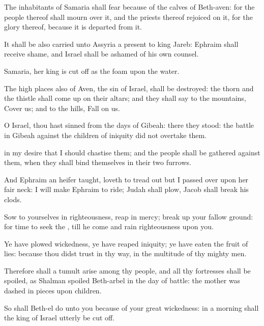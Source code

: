 {The
inhabitants of
Samaria shall
fear because of the
calves of
Beth-aven: for the
people thereof shall
mourn over it, and the
priests thereof
{}
rejoiced on it, for the
glory thereof, because it is
departed from it.

It shall be also
carried unto
Assyria
{} a
present to
king
Jareb:
Ephraim shall
receive
shame, and
Israel shall be
ashamed of his own
counsel.

Samaria, her
king is cut
off as the
foam
upon the
water.

The high
places also of
Aven, the
sin of
Israel, shall be
destroyed: the
thorn and the
thistle shall come
up on their
altars; and they shall
say to the
mountains,
Cover us; and to the
hills,
Fall on us.


\par }{\PP {}O
Israel, thou hast
sinned from the
days of
Gibeah: there they
stood: the
battle in
Gibeah against the
children of
iniquity did not
overtake them.

 in my
desire that I should
chastise them; and the
people shall be
gathered against them, when they shall
bind themselves in their
two
furrows.

And
Ephraim
{} an
heifer
{}
taught,
{}
loveth to tread
out
{} but I passed
over upon her
fair
neck: I will make
Ephraim to
ride;
Judah shall
plow,
{}
Jacob shall break his
clods.

Sow to yourselves in
righteousness,
reap
in
mercy; break
up your fallow
ground: for
{}
time to
seek the
{}, till he
come and
rain
righteousness upon you.

Ye have
plowed
wickedness, ye have
reaped
iniquity; ye have
eaten the
fruit of
lies: because thou didst
trust in thy
way, in the
multitude of thy mighty
men.

Therefore shall a
tumult
arise among thy
people, and all thy
fortresses shall be
spoiled, as
Shalman
spoiled
Beth-arbel in the
day of
battle: the
mother was dashed in
pieces upon
{}
children.

So shall
Beth-el
do unto you
because of your
great
wickedness: in a
morning shall the
king of
Israel
utterly be cut
off.




}
